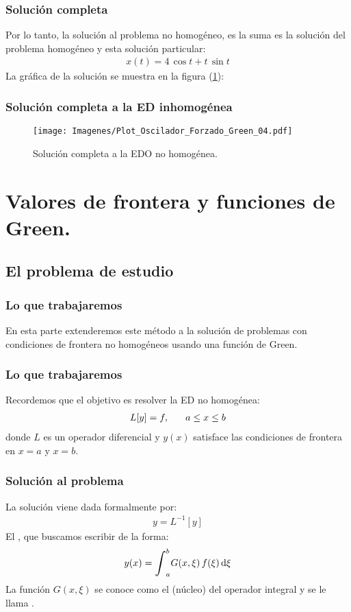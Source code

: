 \documentclass[12pt]{beamer}
\begin{document}
\begin{frame}
\frametitle{Solución completa}
Por lo tanto, la solución al problema no homogéneo, es la suma es la solución del problema homogéneo y esta solución particular:
\pause
\begin{align*}
x (t) = 4 \, \cos t + t \, \sin t
\end{align*}
La gráfica de la solución se muestra en la figura (\ref{fig:figura_04}):
\end{frame}

\begin{frame}
\frametitle{Solución completa a la ED inhomogénea}
\begin{figure}[H]
    \centering
    \texttt{[image: Imagenes/Plot\_Oscilador\_Forzado\_Green\_04.pdf]}
    \caption{Solución completa a la EDO no homogénea.}
    \label{fig:figura_04}
\end{figure}
\end{frame}


\section{Valores de frontera y funciones de Green.}
\subsection{El problema de estudio}

\begin{frame}
\frametitle{Lo que trabajaremos}
En esta parte extenderemos este método a la solución de problemas con condiciones de frontera no homogéneos usando una función de Green.
\end{frame}

\begin{frame}
\frametitle{Lo que trabajaremos}
Recordemos que el objetivo es resolver la ED no homogénea:
\pause
\begin{align*}
L [y] = f, \hspace{0.6cm} a \leq x \leq b
\end{align*}
donde $L$ es un operador diferencial y $y (x)$ satisface las condiciones de frontera en $x = a$ y $x = b$.
\end{frame}

\begin{frame}
\frametitle{Solución al problema}
La solución viene dada formalmente por:
\pause
\begin{align*}
y = L^{-1} [y]
\end{align*}
\pause
El , que buscamos escribir de la forma:
\pause
\begin{align*}
y (x) = \scaleint{6ex}_{a}^{b} G (x, \xi) \, f (\xi) \dd{\xi} 
\end{align*}
La función $G (x, \xi)$ se conoce como el  (núcleo) del operador integral y se le llama .
\end{frame}
\end{document}
